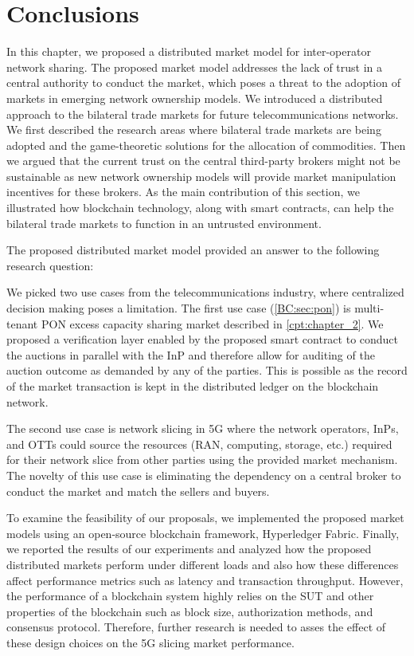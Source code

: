 \section{Conclusions}
\label{bc:sec:Conclusions}
In this chapter, we proposed a distributed market model for inter-operator network sharing. The proposed market model addresses the lack of trust in a central authority to conduct the market, which poses a threat to the adoption of markets in emerging network ownership models.
We introduced a distributed approach to the bilateral trade markets for future telecommunications networks. We first described the research areas where bilateral trade markets are being adopted and the game-theoretic solutions for the allocation of commodities. Then we argued that the current trust on the central third-party brokers might not be sustainable as new network ownership models will provide market manipulation incentives for these brokers. As the main contribution of this section, we illustrated how blockchain technology, along with smart contracts, can help the bilateral trade markets to function in an untrusted environment.

The proposed distributed market model provided an answer to the following research question: 

\textit{\RQe}

We picked two use cases from the telecommunications industry, where centralized decision making poses a limitation. The first use case (\autoref{BC:sec:pon}) is multi-tenant \ac{PON} excess capacity sharing market described in \autoref{cpt:chapter_2}. We proposed a verification layer enabled by the proposed smart contract to conduct the auctions in parallel with the \ac{InP} and therefore allow for auditing of the auction outcome as demanded by any of the parties. This is possible as the record of the market transaction is kept in the distributed ledger on the blockchain network.

The second use case is network slicing in \ac{5G} where the network operators, \acp{InP}, and \acp{OTT} could source the resources (\ac{RAN}, computing, storage, etc.) required for their network slice from other parties using the provided market mechanism. The novelty of this use case is eliminating the dependency on a central broker to conduct the market and match the sellers and buyers. 

To examine the feasibility of our proposals, we implemented the proposed market models using an open-source blockchain framework, Hyperledger Fabric. Finally, we reported the results of our experiments and analyzed how the proposed distributed markets perform under different loads and also how these differences affect performance metrics such as latency and transaction throughput.
However, the performance of a blockchain system highly relies on the \ac{SUT} and other properties of the blockchain such as block size, authorization methods, and consensus protocol. Therefore, further research is needed to asses the effect of these design choices on the \ac{5G} slicing market performance.


